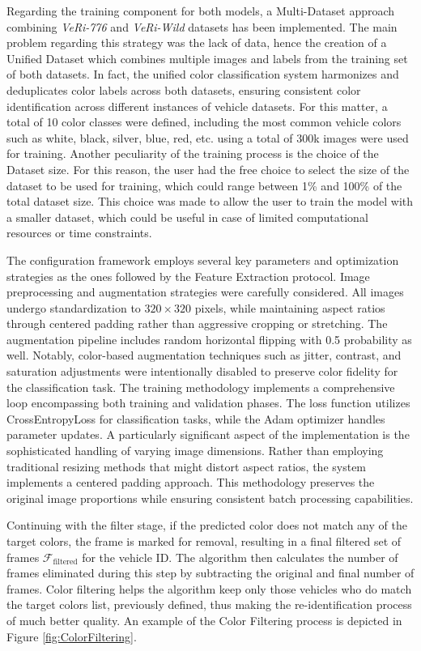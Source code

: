 Regarding the training component for both models, a Multi-Dataset approach combining \textit{VeRi-776} and \textit{VeRi-Wild} datasets has been implemented. The main problem regarding this strategy was the lack of data, hence the creation of a Unified Dataset which combines multiple images and labels from the training set of both datasets. In fact, the unified color classification system harmonizes and deduplicates color labels across both datasets, ensuring consistent color identification across different instances of vehicle datasets. For this matter, a total of 10 color classes were defined, including the most common vehicle colors such as white, black, silver, blue, red, etc. using a total of 300k images were used for training. Another peculiarity of the training process is the choice of the Dataset size. For this reason, the user had the free choice to select the size of the dataset to be used for training, which could range between 1\% and 100\% of the total dataset size. This choice was made to allow the user to train the model with a smaller dataset, which could be useful in case of limited computational resources or time constraints.

The configuration framework employs several key parameters and optimization strategies as the ones followed by the Feature Extraction protocol. Image preprocessing and augmentation strategies were carefully considered. All images undergo standardization to $320 \times 320$ pixels, while maintaining aspect ratios through centered padding rather than aggressive cropping or stretching. The augmentation pipeline includes random horizontal flipping with 0.5 probability as well. Notably, color-based augmentation techniques such as jitter, contrast, and saturation adjustments were intentionally disabled to preserve color fidelity for the classification task.
The training methodology implements a comprehensive loop encompassing both training and validation phases. The loss function utilizes CrossEntropyLoss for classification tasks, while the Adam optimizer handles parameter updates. A particularly significant aspect of the implementation is the sophisticated handling of varying image dimensions. Rather than employing traditional resizing methods that might distort aspect ratios, the system implements a centered padding approach. This methodology preserves the original image proportions while ensuring consistent batch processing capabilities.

Continuing with the filter stage, if the predicted color does not match any of the target colors, the frame is marked for removal, resulting in a final filtered set of frames \(\mathcal{F}_{\text{filtered}}\) for the vehicle ID. The algorithm then calculates the number of frames eliminated during this step by subtracting the original and final number of frames. Color filtering helps the algorithm keep only those vehicles who do match the target colors list, previously defined, thus making the re-identification process of much better quality. An example of the Color Filtering process is depicted in Figure \ref{fig:ColorFiltering}.

